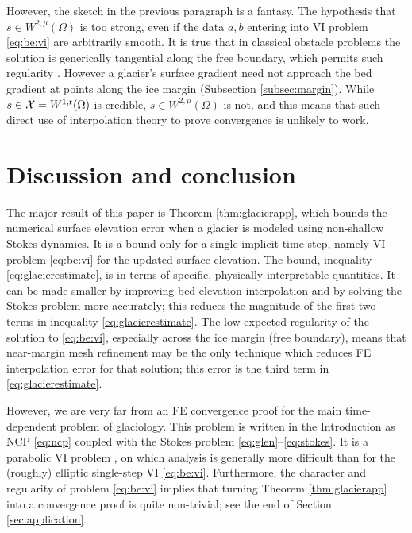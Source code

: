 \documentclass[hidelinks,onefignum,onetabnum,final]{siamart220329}  %
\newcommand{\cX}{\mathcal{X}}
\newcommand{\rr}{{\text{\textnormal{r}}}}
\begin{document}
However, the sketch in the previous paragraph is a fantasy.  The hypothesis that $s\in W^{2,\mu}(\Omega)$ is too strong, even if the data $a,b$ entering into VI problem \eqref{eq:be:vi} are arbitrarily smooth.  It is true that in classical obstacle problems the solution is generically tangential along the free boundary, which permits such regularity \cite[Chapter IV]{KinderlehrerStampacchia1980}.  However a glacier's surface gradient need not approach the bed gradient at points along the ice margin (Subsection \ref{subsec:margin}).  While $s \in \cX = W^{1,\rr}(\Omega)$ is credible, $s\in W^{2,\mu}(\Omega)$ is not, and this means that such direct use of interpolation theory to prove convergence is unlikely to work.


\section{Discussion and conclusion} \label{sec:conclusion}

The major result of this paper is Theorem \ref{thm:glacierapp}, which bounds the numerical surface elevation error when a glacier is modeled using non-shallow Stokes dynamics.  It is a bound only for a single implicit time step, namely VI problem \eqref{eq:be:vi} for the updated surface elevation.  The bound, inequality \eqref{eq:glacierestimate}, is in terms of specific, physically-interpretable quantities.  It can be made smaller by improving bed elevation interpolation and by solving the Stokes problem more accurately; this reduces the magnitude of the first two terms in inequality \eqref{eq:glacierestimate}.  The low expected regularity of the solution to \eqref{eq:be:vi}, especially across the ice margin (free boundary), means that near-margin mesh refinement may be the only technique which reduces FE interpolation error for that solution; this error is the third term in \eqref{eq:glacierestimate}.

However, we are very far from an FE convergence proof for the main time-dependent problem of glaciology.  This problem is written in the Introduction as NCP \eqref{eq:ncp} coupled with the Stokes problem \eqref{eq:glen}--\eqref{eq:stokes}.  It is a parabolic VI problem \cite{Glowinski1984}, on which analysis is generally more difficult than for the (roughly) elliptic single-step VI \eqref{eq:be:vi}.  Furthermore, the character and regularity of problem \eqref{eq:be:vi} implies that turning Theorem \ref{thm:glacierapp} into a convergence proof is quite non-trivial; see the end of Section \ref{sec:application}.
\end{document}
